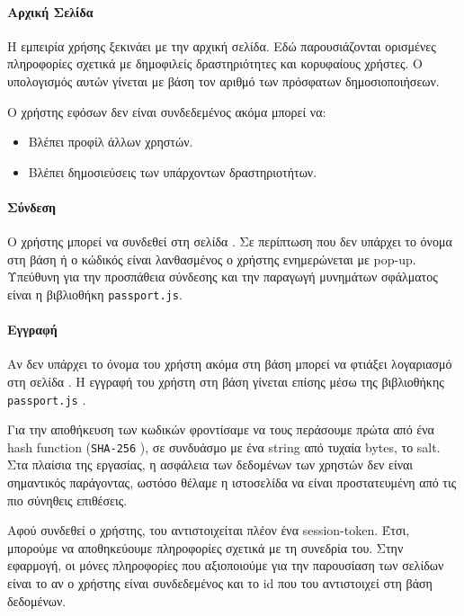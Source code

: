 \documentclass[nonacm, language=english, language=greek]{acmart}
\newcommand{\en}[1]{\textlatin{#1}}
\newcommand{\src}[1]{\texttt{\en{#1}}}
\begin{document}
\paragraph{Αρχική Σελίδα}

Η εμπειρία χρήσης ξεκινάει με την αρχική σελίδα. 
Εδώ παρουσιάζονται ορισμένες πληροφορίες σχετικά με
δημοφιλείς δραστηριότητες και κορυφαίους χρήστες. 
Ο υπολογισμός αυτών γίνεται με βάση τον αριθμό των πρόσφατων δημοσιοποιήσεων.

Ο χρήστης εφόσων δεν είναι συνδεδεμένος ακόμα μπορεί να: 

\begin{itemize}
    \item Βλέπει προφίλ άλλων χρηστών.
    \item Βλέπει δημοσιεύσεις των υπάρχοντων δραστηριοτήτων.
\end{itemize}

\paragraph{Σύνδεση}

Ο χρήστης μπορεί να συνδεθεί στη σελίδα \say{\en{Login}}. Σε περίπτωση που δεν
υπάρχει το όνομα στη βάση ή ο κώδικός είναι λανθασμένος ο χρήστης ενημερώνεται
με \en{pop-up}. Υπεύθυνη για την προσπάθεια σύνδεσης και την παραγωγή μυνημάτων
σφάλματος είναι η βιβλιοθήκη \src{passport.js}. 

\paragraph{Εγγραφή}

Αν δεν υπάρχει το όνομα του χρήστη ακόμα στη βάση μπορεί να φτιάξει λογαριασμό
στη σελίδα \say{\en{Register}}. Η εγγραφή του χρήστη στη βάση γίνεται επίσης
μέσω της βιβλιοθήκης \src{passport.js} \cite{Passport}.

Για την αποθήκευση των κωδικών φροντίσαμε να τους περάσουμε πρώτα από 
ένα \en{hash function} (\src{SHA-256} \cite{SHA256}), σε συνδυάσμο 
με ένα \en{string} από τυχαία \en{bytes}, το \en{salt}.
Στα πλαίσια της εργασίας, η ασφάλεια των δεδομένων των χρηστών δεν είναι 
σημαντικός παράγοντας, ωστόσο θέλαμε η ιστοσελίδα να είναι προστατευμένη 
από τις πιο σύνηθεις επιθέσεις.

Αφού συνδεθεί ο χρήστης, του αντιστοιχείται πλέον ένα \en{session-token}. Έτσι,
μπορούμε να αποθηκεύουμε πληροφορίες σχετικά με τη συνεδρία του. Στην εφαρμογή,
οι μόνες πληροφορίες που αξιοποιούμε για την παρουσίαση των σελίδων είναι το αν
ο χρήστης είναι συνδεδεμένος και το \en{id} που του αντιστοιχεί στη βάση
δεδομένων.
\end{document}
